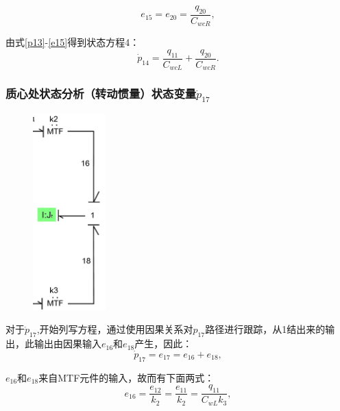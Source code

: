 \begin{equation}\label{2_e15}
e_{15}
=
e_{20}
=
\frac{q_{20}}{C_{wc R}},
\end{equation}

由式\ref{p13}-\ref{e15}得到状态方程4：
\begin{equation}\label{2_p14}
\dot{p}_{14}
=
\frac{q_{11}}{C_{wc L}}
+
\frac{q_{20}}{C_{wc R}}.
\end{equation}

\subsubsection{质心处状态分析（转动惯量）状态变量$\dot{ p}_{17}$}
\begin{figure}[h]
	\centering
	\includegraphics[width=0.25\textwidth]{fig/2_equation5.png}
\end{figure}
对于$\dot{p} _ { 17 }$,开始列写方程，通过使用因果关系对$p_{17}$路径进行跟踪，从1结出来的输出，此输出由因果输入$e _ { 16 }$和$  e _ { 18 }$产生，因此：
\begin{equation}\label{2_p17}
\dot{p}_{17}
=
e_{17}
=
e_{16}
+
e_{18},
\end{equation}

$e _ { 16 }$和$e_{18}$来自MTF元件的输入，故而有下面两式：
\begin{equation}\label{2_e16}
e_{16}
=
\frac{e_{12}}{k_2}
=
\frac{e_{11}}{k_2}
=
\frac{q_{11}}{C_{w L} k_{3}},
\end{equation}

